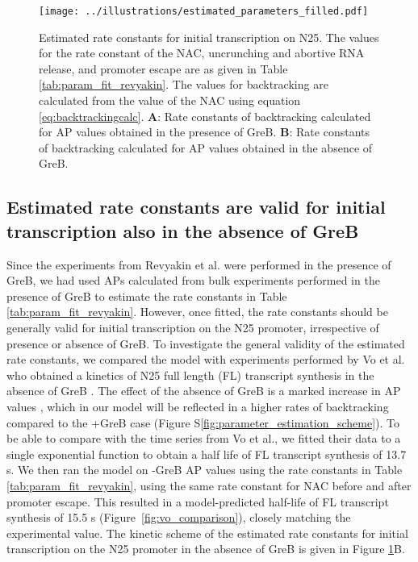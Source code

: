 \begin{figure}
	\begin{center}
      \texttt{[image: ../illustrations/estimated\_parameters\_filled.pdf]}
	\end{center}
    \caption{Estimated rate constants for initial transcription on N25. The
      values for the rate constant of the NAC, uncrunching and abortive RNA
      release, and promoter escape are as given in Table
      \ref{tab:param_fit_revyakin}. The values for backtracking are calculated
      from the value of the NAC using equation \eqref{eq:backtrackingcalc}.
      \textbf{A}: Rate constants of backtracking calculated for AP values
      obtained in the presence of GreB. \textbf{B}: Rate constants of
      backtracking calculated for AP values obtained in the absence of GreB. }
    \label{fig:estimated_parameters}
\end{figure}

\subsection{Estimated rate constants are valid for initial transcription also
in the absence of GreB}
Since the experiments from Revyakin et al. were performed in the presence of
GreB, we had used APs calculated from bulk experiments performed in the presence of
GreB to estimate the rate constants in Table \ref{tab:param_fit_revyakin}.
However, once fitted, the rate constants should be generally valid for initial
transcription on the N25 promoter, irrespective of presence or absence of
GreB. To investigate the general validity of the estimated rate constants, we
compared the model with experiments performed by Vo et al.  who obtained a
kinetics of N25 full length (FL) transcript synthesis in the absence of GreB
\cite{vo_vitro_2003-1}. The effect of the absence of GreB is a marked increase
in AP values \cite{hsu_initial_2006}, which in our model will be reflected in
a higher rates of backtracking compared to the +GreB case (Figure
S\ref{fig:parameter_estimation_scheme}). To be able to compare with the time
series from Vo et al., we fitted their data to a single exponential function
to obtain a half life of FL transcript synthesis of 13.7 s. We then ran the
model on -GreB AP values using the rate constants in Table
\ref{tab:param_fit_revyakin}, using the same rate constant for NAC before and
after promoter escape. This resulted in a model-predicted half-life of FL
transcript synthesis of 15.5 s (Figure~\ref{fig:vo_comparison}), closely
matching the experimental value. The kinetic scheme of the estimated rate
constants for initial transcription on the N25 promoter in the absence of GreB
is given in Figure \ref{fig:estimated_parameters}B.

